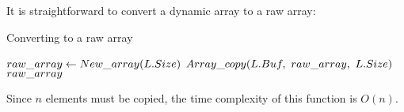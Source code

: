 \HdrDynArrayImpl

It is straightforward to convert a dynamic array to a raw array:

\begin{algorithm}[H]
	\caption{Converting to a raw array \TextDynamicArray}
	\begin{algorithmic}
		\Function{$\FuncToArray$}{$\VarList$}
			\State $raw\_array \gets New\_array(L.Size)$
			\State $\FuncArrayCopy(\VarList.\FieldBuffer,\ \LclRawArray,\ \VarList.\FieldSize)$
			\State \Return $raw\_array$
		\EndFunction
	\end{algorithmic}
\end{algorithm}

Since $n$ elements must be copied, the time complexity of this function is $O(n)$.